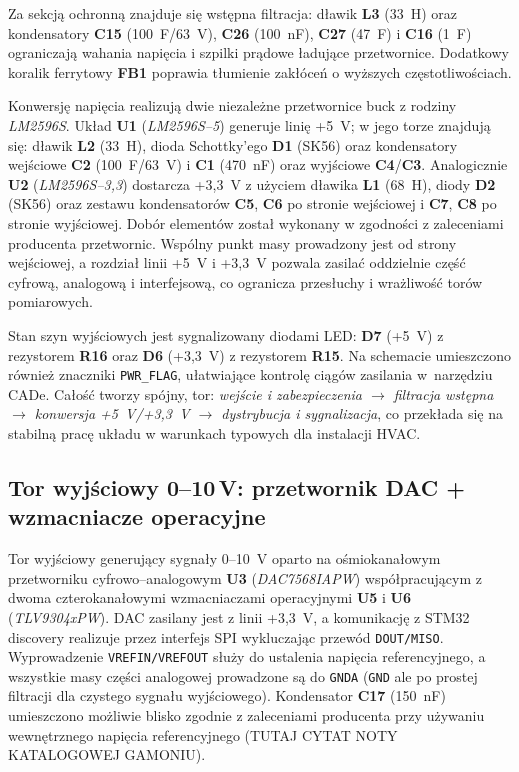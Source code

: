 Za sekcją ochronną znajduje się wstępna filtracja: dławik \textbf{L3} (33~\textmu H) oraz kondensatory \textbf{C15} (100~\textmu F/63~V), \textbf{C26} (100~nF), \textbf{C27} (47~\textmu F) i \textbf{C16} (1~\textmu F) ograniczają wahania napięcia i szpilki prądowe ładujące przetwornice. Dodatkowy koralik ferrytowy \textbf{FB1} poprawia tłumienie zakłóceń o wyższych częstotliwościach.

Konwersję napięcia realizują dwie niezależne przetwornice buck z rodziny \textit{LM2596S}. Układ \textbf{U1} (\textit{LM2596S--5}) generuje linię \mbox{+5~V}; w jego torze znajdują się: dławik \textbf{L2} (33~\textmu H), dioda Schottky’ego \textbf{D1} (SK56) oraz kondensatory wejściowe \textbf{C2} (100~\textmu F/63~V) i \textbf{C1} (470~nF) oraz wyjściowe \textbf{C4}/\textbf{C3}. Analogicznie \textbf{U2} (\textit{LM2596S--3{,}3}) dostarcza \mbox{+3{,}3~V} z użyciem dławika \textbf{L1} (68~\textmu H), diody \textbf{D2} (SK56) oraz zestawu kondensatorów \textbf{C5}, \textbf{C6} po stronie wejściowej i \textbf{C7}, \textbf{C8} po stronie wyjściowej. Dobór elementów został wykonany w zgodności z zaleceniami producenta przetwornic. Wspólny punkt masy prowadzony jest od strony wejściowej, a rozdział linii \mbox{+5~V} i \mbox{+3{,}3~V} pozwala zasilać oddzielnie część cyfrową, analogową i interfejsową, co ogranicza przesłuchy i wrażliwość torów pomiarowych.

Stan szyn wyjściowych jest sygnalizowany diodami LED: \textbf{D7} (\mbox{+5~V}) z rezystorem \textbf{R16} oraz \textbf{D6} (\mbox{+3{,}3~V}) z rezystorem \textbf{R15}. Na schemacie umieszczono również znaczniki \texttt{PWR\_FLAG}, ułatwiające kontrolę ciągów zasilania w~narzędziu CADe. Całość tworzy spójny, tor: \emph{wejście i zabezpieczenia $\rightarrow$ filtracja wstępna $\rightarrow$ konwersja \mbox{+5~V}/\mbox{+3{,}3~V} $\rightarrow$ dystrybucja i sygnalizacja}, co przekłada się na stabilną pracę układu w warunkach typowych dla instalacji HVAC.


\subsection{Tor wyjściowy \texorpdfstring{0--10\,V}{0–10 V}: przetwornik DAC + wzmacniacze operacyjne}

Tor wyjściowy generujący sygnały \mbox{0--10~V} oparto na ośmiokanałowym przetworniku cyfrowo–analogowym \textbf{U3} (\textit{DAC7568IAPW}) współpracującym z dwoma czterokanałowymi wzmacniaczami operacyjnymi \textbf{U5} i \textbf{U6} (\textit{TLV9304xPW}). DAC zasilany jest z linii \mbox{+3{,}3~V}, a komunikację z STM32 discovery realizuje przez interfejs SPI wykluczając przewód \texttt{DOUT/MISO}. Wyprowadzenie \texttt{VREFIN/VREFOUT} służy do ustalenia napięcia referencyjnego, a wszystkie masy części analogowej prowadzone są do \texttt{GNDA} (\texttt{GND} ale po prostej filtracji dla czystego sygnału wyjściowego). Kondensator \textbf{C17} (\mbox{150~nF}) umieszczono możliwie blisko zgodnie z zaleceniami producenta przy używaniu wewnętrznego napięcia referencyjnego (TUTAJ CYTAT NOTY KATALOGOWEJ GAMONIU).

